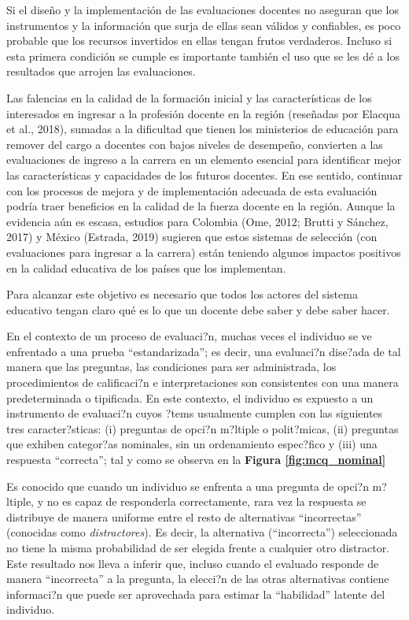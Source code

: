 Si el diseño y la implementación de las evaluaciones docentes no aseguran que los instrumentos y la información que surja de ellas sean válidos y confiables, es poco probable que los recursos invertidos en ellas tengan frutos verdaderos. Incluso si esta primera condición se cumple es importante también el uso que se les dé a los resultados que arrojen las evaluaciones.


Las falencias en la calidad de la formación inicial y las características de los interesados
en ingresar a la profesión docente en la región (reseñadas por Elacqua et al., 2018), sumadas a la dificultad que tienen los ministerios de educación para remover del cargo a docentes con bajos niveles de desempeño, convierten a las evaluaciones de ingreso a la carrera en un elemento esencial para identificar mejor las características y capacidades de los futuros docentes. En ese sentido, continuar con los procesos de mejora y de implementación adecuada de esta evaluación podría traer beneficios en la calidad de la fuerza docente en la región. Aunque la evidencia aún es escasa, estudios para Colombia (Ome, 2012; Brutti y Sánchez, 2017) y México (Estrada, 2019) sugieren que estos sistemas de selección (con evaluaciones para ingresar a la carrera) están teniendo algunos impactos positivos en la calidad educativa de los países que los implementan.


Para alcanzar este objetivo es necesario que todos los actores del sistema educativo tengan claro qué es lo que un docente debe saber y debe saber hacer.

En el contexto de un proceso de evaluaci?n, muchas veces el individuo se ve enfrentado a una prueba ``estandarizada''; es decir, una evaluaci?n dise?ada de tal manera que las preguntas, las condiciones para ser administrada, los procedimientos de calificaci?n e interpretaciones son consistentes con una manera predeterminada o tipificada. En este contexto, el individuo es expuesto a un instrumento de evaluaci?n cuyos ?tems usualmente cumplen con las siguientes tres caracter?sticas: (i) preguntas de opci?n m?ltiple o polit?micas, (ii) preguntas que exhiben categor?as nominales, sin un ordenamiento espec?fico y (iii) una respuesta ``correcta''; tal y como se observa en la \textbf{Figura \ref{fig:mcq_nominal}}


Es conocido que cuando un individuo se enfrenta a una pregunta de opci?n m?ltiple, y no es capaz de responderla correctamente, rara vez la respuesta se distribuye de manera uniforme entre el resto de alternativas ``incorrectas'' (conocidas como \textit{distractores}). Es decir, la alternativa (``incorrecta'') seleccionada no tiene la misma probabilidad de ser elegida frente a cualquier otro distractor. Este resultado nos lleva a inferir que, incluso cuando el evaluado responde de manera ``incorrecta'' a la pregunta, la elecci?n de las otras alternativas contiene informaci?n que puede ser aprovechada para estimar la ``habilidad'' latente del individuo.


